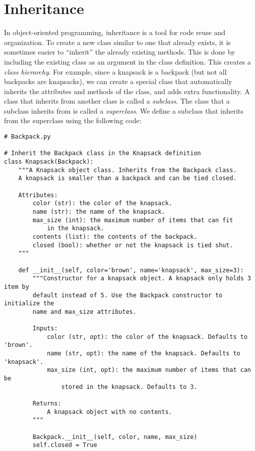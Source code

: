 \section*{Inheritance}

In object-oriented programming, inheritance is a tool for code reuse and organization.
To create a new class similar to one that already exists, it is sometimes easier to ``inherit'' the already existing methods.
This is done by including the existing class as an argument in the class definition.
This creates a \emph{class hierarchy}.
For example, since a knapsack is a backpack (but not all backpacks are knapsacks), we can create a special  class that automatically inherits the attributes and methods of the  class, and adds extra functionality.
A class that inherits from another class is called a \emph{subclass}.
The class that a subclass inherits from is called a \emph{superclass}.
We define a  subclass that inherits from the  superclass using the following code:

\begin{lstlisting}
# Backpack.py

# Inherit the Backpack class in the Knapsack definition
class Knapsack(Backpack):
    """A Knapsack object class. Inherits from the Backpack class.
    A knapsack is smaller than a backpack and can be tied closed.
    
    Attributes:
        color (str): the color of the knapsack.
        name (str): the name of the knapsack.
        max_size (int): the maximum number of items that can fit
            in the knapsack.
        contents (list): the contents of the backpack.
        closed (bool): whether or not the knapsack is tied shut.
    """
    
    def __init__(self, color='brown', name='knapsack', max_size=3):
        """Constructor for a knapsack object. A knapsack only holds 3 item by
        default instead of 5. Use the Backpack constructor to initialize the
        name and max_size attributes.
        
        Inputs:
            color (str, opt): the color of the knapsack. Defaults to 'brown'.
            name (str, opt): the name of the knapsack. Defaults to 'knapsack'.
            max_size (int, opt): the maximum number of items that can be
                stored in the knapsack. Defaults to 3.
        
        Returns:
            A knapsack object with no contents.
        """
        
        Backpack.__init__(self, color, name, max_size)
        self.closed = True
\end{lstlisting}

